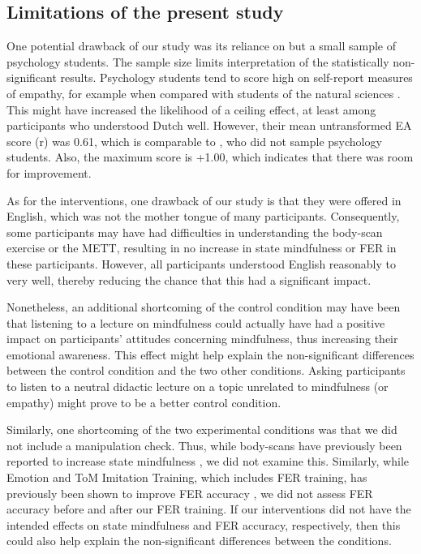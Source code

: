 \documentclass[authordate, empirical]{jote-new-article}
\begin{document}
	\subsection{Limitations of the present study}



	One potential drawback of our study was its reliance on but a small sample of psychology students. The sample size limits interpretation of the statistically non-significant results. Psychology students tend to score high on self-report measures of empathy, for example when compared with students of the natural sciences \parencites{Thomson2015}. This might have increased the likelihood of a ceiling effect, at least among participants who understood Dutch well. However, their mean untransformed EA score (r) was 0.61, which is comparable to \textcite{Thiel2018}, who did not sample psychology students. Also, the maximum score is +1.00, which indicates that there was room for improvement.



	As for the interventions, one drawback of our study is that they were offered in English, which was not the mother tongue of many participants. Consequently, some participants may have had difficulties in understanding the body-scan exercise or the METT, resulting in no increase in state mindfulness or FER in these participants. However, all participants understood English reasonably to very well, thereby reducing the chance that this had a significant impact.



	Nonetheless, an additional shortcoming of the control condition may have been that listening to a lecture on mindfulness could actually have had a positive impact on participants' attitudes concerning mindfulness, thus increasing their emotional awareness. This effect might help explain the non-significant differences between the control condition and the two other conditions. Asking participants to listen to a neutral didactic lecture on a topic unrelated to mindfulness (or empathy) might prove to be a better control condition.



	Similarly, one shortcoming of the two experimental conditions was that we did not include a manipulation check. Thus, while body-scans have previously been reported to increase state mindfulness \parencites{Upton2019}, we did not examine this. Similarly, while Emotion and ToM Imitation Training, which includes FER training, has previously been shown to improve FER accuracy \parencites{Mazza2010}, we did not assess FER accuracy before and after our FER training. If our interventions did not have the intended effects on state mindfulness and FER accuracy, respectively, then this could also help explain the non-significant differences between the conditions.
\end{document}
